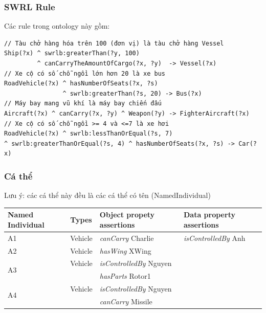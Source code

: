 {\subsubsection{SWRL Rule}
Các rule trong ontology này gồm:
\begin{verbatim}
// Tàu chở hàng hóa trên 100 (đơn vị) là tàu chở hàng Vessel
Ship(?x) ^ swrlb:greaterThan(?y, 100) 
         ^ canCarryTheAmountOfCargo(?x, ?y)  -> Vessel(?x)
// Xe cộ có số chỗ ngồi lớn hơn 20 là xe bus
RoadVehicle(?x) ^ hasNumberOfSeats(?x, ?s)
                ^ swrlb:greaterThan(?s, 20) -> Bus(?x)
// Máy bay mang vũ khí là máy bay chiến đấu
Aircraft(?x) ^ canCarry(?x, ?y) ^ Weapon(?y) -> FighterAircraft(?x)
// Xe cộ có số chỗ ngồi >= 4 và <=7 là xe hơi
RoadVehicle(?x) ^ swrlb:lessThanOrEqual(?s, 7) 
^ swrlb:greaterThanOrEqual(?s, 4) ^ hasNumberOfSeats(?x, ?s) -> Car(?x)
\end{verbatim}
\subsubsection{Cá thể}
Lưu ý: các cá thể này đều là các cá thể có tên (NamedIndividual)
\begin{table}[ht!]
\centering
\begin{tabular}{|p{2cm}|l|p{5cm}|p{5cm}|}
\hline
Named Individual & Types & Object propety assertions & Data property assertions \\ \hline
A1 & Vehicle & \textit{canCarry} Charlie & \textit{isControlledBy} Anh \\ \hline
A2 & Vehicle & \textit{hasWing} XWing &  \\ \hline
\multirow{2}{*}{A3} & Vehicle & \textit{isControlledBy} Nguyen &  \\ 
& &\textit{hasParts} Rotor1 & \\ \hline
\multirow{2}{*}{A4} & Vehicle & \textit{isControlledBy} Nguyen &  \\ 
& &\textit{canCarry} Missile & \\ \hline
  

\end{tabular}
\end{table}}
